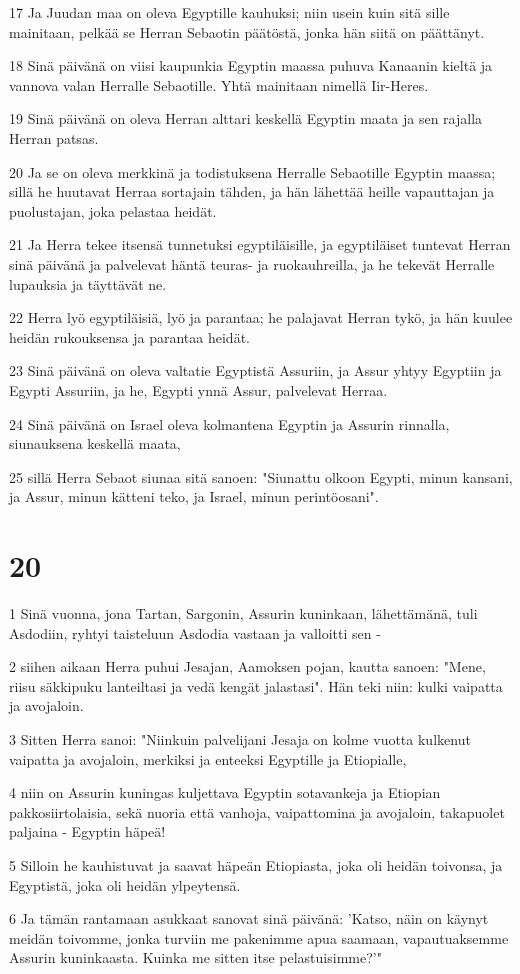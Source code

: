 \par 17 Ja Juudan maa on oleva Egyptille kauhuksi; niin usein kuin sitä sille mainitaan, pelkää se Herran Sebaotin päätöstä, jonka hän siitä on päättänyt.
\par 18 Sinä päivänä on viisi kaupunkia Egyptin maassa puhuva Kanaanin kieltä ja vannova valan Herralle Sebaotille. Yhtä mainitaan nimellä Iir-Heres.
\par 19 Sinä päivänä on oleva Herran alttari keskellä Egyptin maata ja sen rajalla Herran patsas.
\par 20 Ja se on oleva merkkinä ja todistuksena Herralle Sebaotille Egyptin maassa; sillä he huutavat Herraa sortajain tähden, ja hän lähettää heille vapauttajan ja puolustajan, joka pelastaa heidät.
\par 21 Ja Herra tekee itsensä tunnetuksi egyptiläisille, ja egyptiläiset tuntevat Herran sinä päivänä ja palvelevat häntä teuras- ja ruokauhreilla, ja he tekevät Herralle lupauksia ja täyttävät ne.
\par 22 Herra lyö egyptiläisiä, lyö ja parantaa; he palajavat Herran tykö, ja hän kuulee heidän rukouksensa ja parantaa heidät.
\par 23 Sinä päivänä on oleva valtatie Egyptistä Assuriin, ja Assur yhtyy Egyptiin ja Egypti Assuriin, ja he, Egypti ynnä Assur, palvelevat Herraa.
\par 24 Sinä päivänä on Israel oleva kolmantena Egyptin ja Assurin rinnalla, siunauksena keskellä maata,
\par 25 sillä Herra Sebaot siunaa sitä sanoen: "Siunattu olkoon Egypti, minun kansani, ja Assur, minun kätteni teko, ja Israel, minun perintöosani".

\chapter{20}

\par 1 Sinä vuonna, jona Tartan, Sargonin, Assurin kuninkaan, lähettämänä, tuli Asdodiin, ryhtyi taisteluun Asdodia vastaan ja valloitti sen -
\par 2 siihen aikaan Herra puhui Jesajan, Aamoksen pojan, kautta sanoen: "Mene, riisu säkkipuku lanteiltasi ja vedä kengät jalastasi". Hän teki niin: kulki vaipatta ja avojaloin.
\par 3 Sitten Herra sanoi: "Niinkuin palvelijani Jesaja on kolme vuotta kulkenut vaipatta ja avojaloin, merkiksi ja enteeksi Egyptille ja Etiopialle,
\par 4 niin on Assurin kuningas kuljettava Egyptin sotavankeja ja Etiopian pakkosiirtolaisia, sekä nuoria että vanhoja, vaipattomina ja avojaloin, takapuolet paljaina - Egyptin häpeä!
\par 5 Silloin he kauhistuvat ja saavat häpeän Etiopiasta, joka oli heidän toivonsa, ja Egyptistä, joka oli heidän ylpeytensä.
\par 6 Ja tämän rantamaan asukkaat sanovat sinä päivänä: 'Katso, näin on käynyt meidän toivomme, jonka turviin me pakenimme apua saamaan, vapautuaksemme Assurin kuninkaasta. Kuinka me sitten itse pelastuisimme?'"

